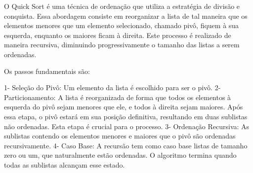 O Quick Sort é uma técnica de ordenação que utiliza a estratégia de divisão e conquista. Essa abordagem consiste em reorganizar a lista de tal maneira que os elementos menores que um elemento selecionado, chamado pivô, fiquem à sua esquerda, enquanto os maiores ficam à direita. Este processo é realizado de maneira recursiva, diminuindo progressivamente o tamanho das listas a serem ordenadas\cite{devto_quick_sort}.

Os passos fundamentais são:

1- Seleção do Pivô: Um elemento da lista é escolhido para ser o pivô.
2- Particionamento: A lista é reorganizada de forma que todos os elementos à esquerda do pivô sejam menores que ele, e todos à direita sejam maiores. Após essa etapa, o pivô estará em sua posição definitiva, resultando em duas sublistas não ordenadas. Esta etapa é crucial para o processo.
3- Ordenação Recursiva: As sublistas contendo os elementos menores e maiores que o pivô são ordenadas recursivamente.
4- Caso Base: A recursão tem como caso base listas de tamanho zero ou um, que naturalmente estão ordenadas. O algoritmo termina quando todas as sublistas alcançam esse estado.

